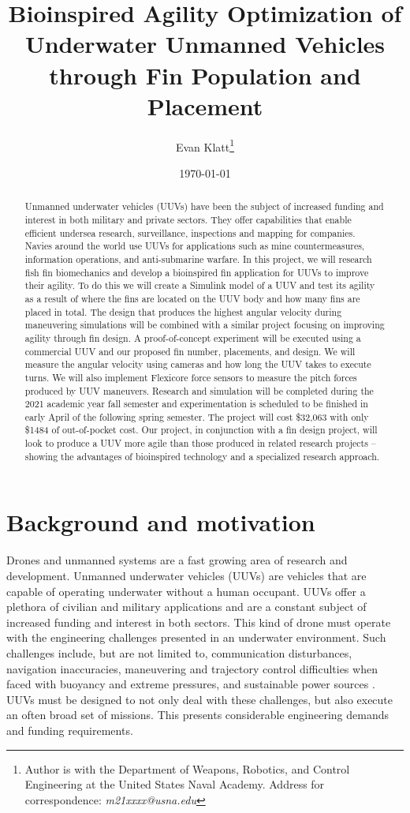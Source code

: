 \documentclass{IEEEtran}
\title{Bioinspired Agility Optimization of Underwater Unmanned Vehicles through Fin Population and Placement}
\author{Evan Klatt\thanks{Author is with the Department of Weapons, Robotics, and Control Engineering at the United States Naval Academy. Address for correspondence: \emph{m21xxxx@usna.edu}}}
\date{\today}
\begin{document}
\maketitle
\begin{abstract}
Unmanned underwater vehicles (UUVs) have been the subject of increased funding and interest in both military and private sectors. They offer capabilities that enable efficient undersea research, surveillance, inspections and mapping for companies. Navies around the world use UUVs for applications such as mine countermeasures, information operations, and anti-submarine warfare. In this project, we will research fish fin biomechanics and develop a bioinspired fin application for UUVs to improve their agility. To do this we will create a Simulink model of a UUV and test its agility as a result of where the fins are located on the UUV body and how many fins are placed in total. The design that produces the highest angular velocity during maneuvering simulations will be combined with a similar project focusing on improving agility through fin design. A proof-of-concept experiment will be executed using a commercial UUV and our proposed fin number, placements, and design. We will measure the angular velocity using cameras and how long the UUV takes to execute turns. We will also implement Flexicore force sensors to measure the pitch forces produced by UUV maneuvers. Research and simulation will be completed during the 2021 academic year fall semester and experimentation is scheduled to be finished in early April of the following spring semester. The project will cost \$32,063 with only \$1484 of out-of-pocket cost. Our project, in conjunction with a fin design project, will look to produce a UUV more agile than those produced in related research projects  -- showing the advantages of bioinspired technology and a specialized research approach.
\end{abstract}

\section{Background and motivation}
Drones and unmanned systems are a fast growing area of research and development. Unmanned underwater vehicles (UUVs) are vehicles that are capable of operating underwater without a human occupant. UUVs offer a plethora of civilian and military applications and are a constant subject of increased funding and interest in both sectors. This kind of drone must operate with the engineering challenges presented in an underwater environment. Such challenges include, but are not limited to, communication disturbances, navigation inaccuracies, maneuvering and trajectory control difficulties when faced with buoyancy and extreme pressures, and sustainable power sources \cite{nrc2005autonomous}. UUVs must be designed to not only deal with these challenges, but also execute an often broad set of missions. This presents considerable engineering demands and funding requirements.
\end{document}
